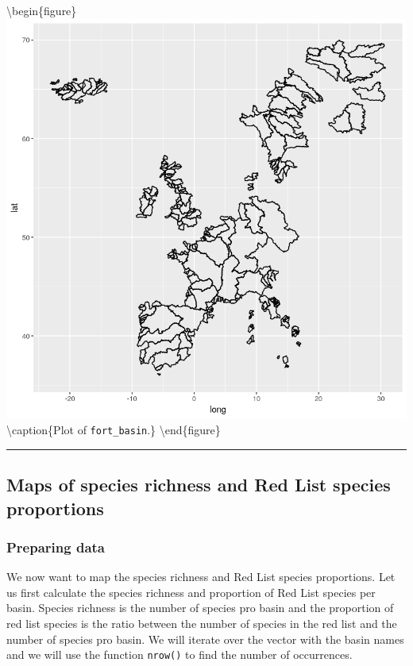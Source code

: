 \documentclass[
]{book}
\begin{document}
\textbackslash begin\{figure\}
\includegraphics[width=11.67in]{./figures/output_186_0} \textbackslash caption\{Plot of \texttt{fort\_basin}.\}\label{fig:europe}
\textbackslash end\{figure\}

\begin{center}\rule{0.5\linewidth}{0.5pt}\end{center}

\hypertarget{maps-of-species-richness-and-red-list-species-proportions}{%
\subsection{Maps of species richness and Red List species proportions}\label{maps-of-species-richness-and-red-list-species-proportions}}

\hypertarget{preparing-data}{%
\subsubsection*{Preparing data}\label{preparing-data}}

We now want to map the species richness and Red List species proportions. Let us first calculate the species richness and proportion of Red List species per basin. Species richness is the number of species pro basin and the proportion of red list species is the ratio between the number of species in the red list and the number of species pro basin. We will iterate over the vector with the basin names and we will use the function \texttt{nrow()} to find the number of occurrences.
\end{document}
